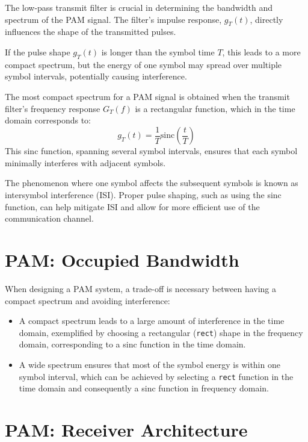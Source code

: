 The low-pass transmit filter is crucial in determining the bandwidth and spectrum of the PAM signal. The filter's impulse response, \( g_T(t) \), directly influences the shape of the transmitted pulses.

If the pulse shape \( g_T(t) \) is longer than the symbol time \( T \), this leads to a more compact spectrum, but the energy of one symbol may spread over multiple symbol intervals, potentially causing interference.

The most compact spectrum for a PAM signal is obtained when the transmit filter's frequency response \( G_T(f) \) is a rectangular function, which in the time domain corresponds to:
\[ g_T(t) = \frac{1}{T} \text{sinc}\left( \frac{t}{T} \right) \]
This sinc function, spanning several symbol intervals, ensures that each symbol minimally interferes with adjacent symbols.

The phenomenon where one symbol affects the subsequent symbols is known as intersymbol interference (ISI). Proper pulse shaping, such as using the sinc function, can help mitigate ISI and allow for more efficient use of the communication channel.


\section*{PAM: Occupied Bandwidth}

When designing a PAM system, a trade-off is necessary between having a compact spectrum and avoiding interference:
\begin{itemize}
    \item A compact spectrum leads to a large amount of interference in the time domain, exemplified by choosing a rectangular (\texttt{rect}) shape in the frequency domain, corresponding to a sinc function in the time domain.
    \item A wide spectrum ensures that most of the symbol energy is within one symbol interval, which can be achieved by selecting a \texttt{rect} function in the time domain and consequently a sinc function in frequency domain.
\end{itemize}

\section*{PAM: Receiver Architecture}

